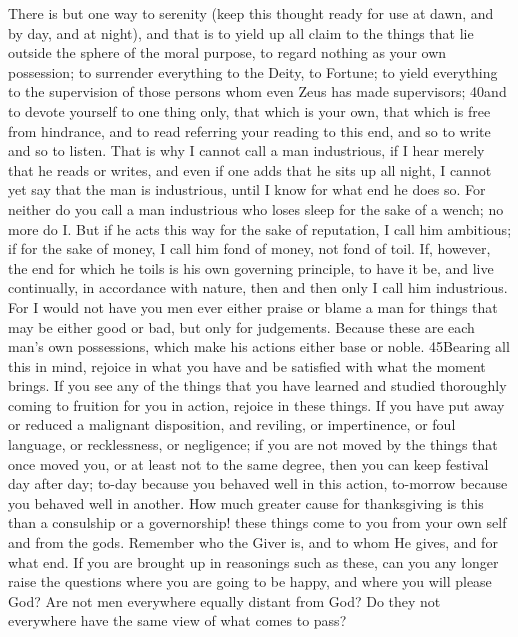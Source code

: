 There is but one way to serenity (keep this thought ready for use at dawn, and by day, and at night), and that is to yield up all claim to the things that lie outside the sphere of the moral purpose, to regard nothing as your own possession; to surrender everything to the Deity, to Fortune; to yield everything to the supervision of those persons whom even Zeus has made supervisors; 40and to devote yourself to one thing only, that which is your own, that which is free from hindrance, and to read referring your reading to this end, and so to write and so to listen. That is why I cannot call a man industrious, if I hear merely that he reads or writes, and even if one adds that he sits up all night, I cannot yet say that the man is industrious, until I know for what end he does so. For neither do you call a man industrious who loses sleep for the sake of a wench; no more do I. But if he acts this way for the sake of reputation, I call him ambitious; if for the sake of money, I call him fond of money, not fond of toil. If, however, the end for which he toils is his own governing principle, to have it be, and live continually, in accordance with nature, then and then only I call him industrious. For I would not have you men ever either praise or blame a man for things that may be either good or bad, but only for judgements. Because these are each man's own possessions, which make his actions either base or noble. 45Bearing all this in mind, rejoice in what you have and be satisfied with what the moment brings. If you see any of the things that you have learned and studied thoroughly coming to fruition for you in action, rejoice in these things. If you have put away or reduced a malignant disposition, and reviling, or impertinence, or foul language, or recklessness, or negligence; if you are not moved by the things that once moved you, or at least not to the same degree, then you can keep festival day after day; to-day because you behaved well in this action, to-morrow because you behaved well in another. How much greater cause for thanksgiving is this than a consulship or a governorship! these things come to you from your own self and from the gods. Remember who the Giver is, and to whom He gives, and for what end. If you are brought up in reasonings such as these, can you any longer raise the questions where you are going to be happy, and where you will please God? Are not men everywhere equally distant from God? Do they not everywhere have the same view of what comes to pass?


